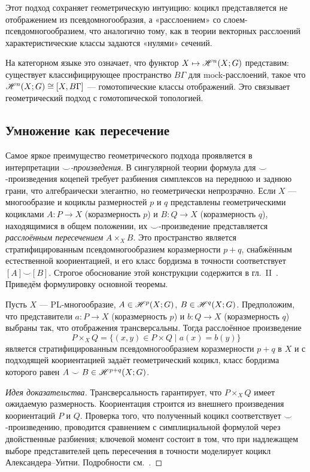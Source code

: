 \documentclass[12pt]{article}
\begin{document}
Этот подход сохраняет геометрическую интуицию: коцикл представляется не отображением из псевдомногообразия, а «расслоением» со слоем-псев\-дом\-но\-го\-об\-ра\-зи\-ем, что аналогично тому, как в теории векторных расслоений характеристические классы задаются «нулями» сечений.

На категорном языке это означает, что функтор $X \mapsto \mathscr{H}^n(X;G)$ представим: существует классифицирующее пространство $B\Gamma$ для mock-расслоений, такое что $\mathscr{H}^n(X;G) \cong [X, B\Gamma]$ — гомотопические классы отображений. Это связывает геометрический подход с гомотопической топологией.

\subsection{Умножение как пересечение}

Самое яркое преимущество геометрического подхода проявляется в интерпретации \emph{$\smile$-произведения}. В сингулярной теории формула для $\smile$-произведения коцепей требует разбиения симплексов на переднюю и заднюю грани, что алгебраически элегантно, но геометрически непрозрачно. Если $X$ --- многообразие и коциклы размерностей $p$ и $q$ представлены геометрическими коциклами $A \colon P \to X$ (коразмерность $p$) и $B \colon Q \to X$ (коразмерность $q$), находящимися в общем положении, их $\smile$-произведение представляется \emph{расслоённым пересечением} $A \times_X B$. Это пространство является стратифицированным псевдомногообразием коразмерности $p+q$, снабжённым естественной коориентацией, и его класс бордизма в точности соответствует $[A] \smile [B]$. Строгое обоснование этой конструкции содержится в гл.~II~\cite{BRS}. Приведём формулировку основной теоремы.

\begin{theorem}\label{thm:cup}
Пусть $X$ --- PL-многообразие, $A \in \mathscr{H}^p(X;G)$, $B \in \mathscr{H}^q(X;G)$. Предположим, что представители $a: P \to X$ (коразмерность $p$) и $b: Q \to X$ (коразмерность $q$) выбраны так, что отображения трансверсальны. Тогда расслоённое произведение
\begin{equation}\label{eq:fibreproduct}
P \times_X Q = \{(x,y) \in P \times Q \mid a(x) = b(y)\}
\end{equation}
является стратифицированным псевдомногообразием коразмерности $p+q$ в $X$ и с подходящей коориентацией задаёт геометрический коцикл, класс бордизма которого равен $A \smile B \in \mathscr{H}^{p+q}(X;G)$.
\end{theorem}
\begin{proof}[Идея доказательства]
Трансверсальность гарантирует, что $P \times_X Q$ имеет ожидаемую размерность. Коориентация строится из внешнего произведения коориентаций $P$ и $Q$. Проверка того, что полученный коцикл соответствует $\smile$-произведению, проводится сравнением с симплициальной формулой через двойственные разбиения; ключевой момент состоит в том, что при надлежащем выборе представителей цепь пересечения в точности моделирует коцикл Александера–Уитни. Подробности см.~\cite[Гл.~II, §4]{BRS}. %
\end{proof}
\end{document}
